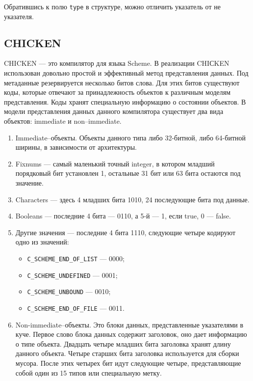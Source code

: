 Обратившись к полю \texttt{type} в структуре, можно отличить указатель от не указателя.

\subsection {CHICKEN}

CHICKEN --- это компилятор для языка Scheme. В реализации CHIСKEN использован довольно простой и эффективный метод представления данных.
Под метаданные резервируется несколько битов слова. Для этих битов существуют коды, которые отвечают за
принадлежность объектов к различным моделям представления. Коды хранят специальную информацию о состоянии объектов.
В  модели представления данных данного компилятора
существует два вида объектов: immediate и non--immediate.

\begin{enumerate}
\item Immediate--объекты.
Объекты данного типа либо 32-битной, либо 64-битной ширины, в зависимости от архитектуры.
\item Fixnums --- самый маленький точный integer, в котором младший порядковый бит 
установлен 1, остальные 31 бит или 63 бита остаются под значение.
\item Characters --- здесь 4 младших бита 1010, 24 последующие бита под данные.
\item Booleans --- последние 4 бита --- 0110, а 5-й --- 1, если true, 0 --- false.
\item Другие значения --- последние 4 бита 1110, следующие четыре кодируют одно из значений:
\begin{itemize}
\item \lstinline{C_SCHEME_END_OF_LIST} --- 0000;
\item \lstinline{C_SCHEME_UNDEFINED} --- 0001;
\item \lstinline{C_SCHEME_UNBOUND} --- 0010;
\item \lstinline{C_SCHEME_END_OF_FILE} --- 0011.
\end{itemize}

\item Non-immediate--объекты.
Это блоки данных, представленные указателями в куче.
Первое слово блока данных содержит заголовок, оно дает информацию о типе объекта. 
Двадцать четыре младших бита заголовка хранят длину данного объекта.
Четыре старших бита заголовка используется для сборки 
мусора.
После этих четырех бит идут следующие четыре, представляющие собой один из 15 типов или специальную метку.
\end{enumerate}

